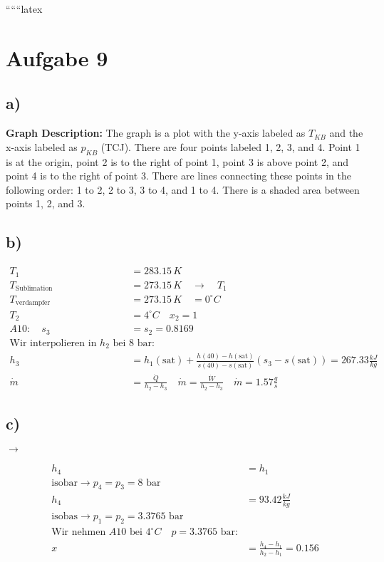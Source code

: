 
``````latex


\section*{Aufgabe 9}

\subsection*{a)}

\textbf{Graph Description:} The graph is a plot with the y-axis labeled as \( T_{KB} \) and the x-axis labeled as \( p_{KB} \) (TCJ). There are four points labeled 1, 2, 3, and 4. Point 1 is at the origin, point 2 is to the right of point 1, point 3 is above point 2, and point 4 is to the right of point 3. There are lines connecting these points in the following order: 1 to 2, 2 to 3, 3 to 4, and 1 to 4. There is a shaded area between points 1, 2, and 3.

\subsection*{b)}

\begin{align*}
T_1 &= 283.15\,K \\
T_{\text{Sublimation}} &= 273.15\,K \quad \rightarrow \quad T_1 \\
T_{\text{verdampfer}} &= 273.15\,K \quad = 0^\circ C \\
T_2 &= 4^\circ C \quad x_2 = 1 \\
A10: \quad s_3 &= s_2 = 0.8169 \\
\text{Wir interpolieren in } h_2 \text{ bei } 8 \text{ bar:} \\
h_3 &= h_1(\text{sat}) + \frac{h(40) - h(\text{sat})}{s(40) - s(\text{sat})} (s_3 - s(\text{sat})) = 267.33 \frac{kJ}{kg} \\
\dot{m} &= \frac{\dot{Q}}{h_2 - h_3} \quad \dot{m} = \frac{\dot{W}}{h_2 - h_3} \quad \dot{m} = 1.57 \frac{g}{s}
\end{align*}

\subsection*{c)}

 \(\rightarrow\) 

\begin{align*}
h_4 &= h_1 \\
\text{isobar} \rightarrow p_4 = p_3 = 8 \text{ bar} \\
h_4 &= 93.42 \frac{kJ}{kg} \\
\text{isobas} \rightarrow p_1 = p_2 = 3.3765 \text{ bar} \\
\text{Wir nehmen } A10 \text{ bei } 4^\circ C \quad p = 3.3765 \text{ bar:} \\
x &= \frac{h_4 - h_1}{h_2 - h_1} = 0.156
\end{align*}

